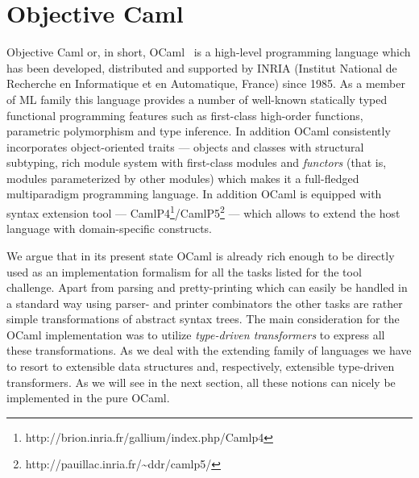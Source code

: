 \section{Objective Caml}

Objective Caml or, in short, OCaml~\cite{OcamlDef, Remy} is a high-level programming language which 
has been developed, distributed and supported by INRIA (Institut National de Recherche en 
Informatique et en Automatique, France) since 1985. As a member of ML family this language 
provides a number of well-known statically typed functional programming features such as
first-class high-order functions, parametric polymorphism and type inference. In addition
OCaml consistently incorporates object-oriented traits --- objects and classes with 
structural subtyping, rich module system with first-class modules and \emph{functors} (that is, 
modules parameterized by other modules) which makes it a full-fledged multiparadigm programming
language. In addition OCaml is equipped with syntax extension tool --- 
CamlP4\footnote{http://brion.inria.fr/gallium/index.php/Camlp4}/CamlP5\footnote{http://pauillac.inria.fr/\textasciitilde ddr/camlp5/} --- which allows to extend the host language with domain-specific constructs. 

We argue that in its present state OCaml is already rich enough to be directly used as an 
implementation formalism for all the tasks listed for the tool challenge. Apart from parsing and 
pretty-printing which can easily be handled in a standard way using parser- and printer combinators 
the other tasks are rather simple transformations of abstract syntax trees. The main consideration
for the OCaml implementation was to utilize \emph{type-driven transformers} to express all these
transformations. As we deal with the extending family of languages we have to resort to extensible
data structures and, respectively, extensible type-driven transformers. As we will see in the next 
section, all these notions can nicely be implemented in the pure OCaml. 

